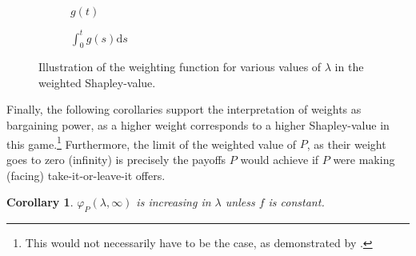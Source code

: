 \documentclass[a4paper]{article}
\newtheorem{corollary}{Corollary}
\newcommand{\ds}{\mathrm{d}s}
\begin{document}
\begin{figure}[ht]
    \centering
    \begin{subfigure}[b]{0.45\textwidth}
        \centering
        \caption{$g(t)$}
    \end{subfigure}
    \begin{subfigure}[b]{0.45\textwidth}
        \centering
        \caption{$\int_0^t g(s) \ds$}
    \end{subfigure}
    \caption{Illustration of the weighting function for various values of $\lambda$ in the weighted Shapley-value.}
    \label{fig:weigh_function}
\end{figure}

Finally, the following corollaries support the interpretation of weights as bargaining power, as a higher weight corresponds to a higher Shapley-value in this game.\footnote{
    This would not necessarily have to be the case, as demonstrated by \textcite{owen1968communications}.
}
Furthermore, the limit of the weighted value of $P$, as their weight goes to zero (infinity) is precisely the payoffs $P$ would achieve if $P$ were making (facing) take-it-or-leave-it offers.

\begin{corollary}
    \label{cor:platform_value_weighted}
    $\varphi_P(\lambda, \infty)$ is increasing in $\lambda$ unless $f$ is constant.
\end{corollary}
\end{document}
